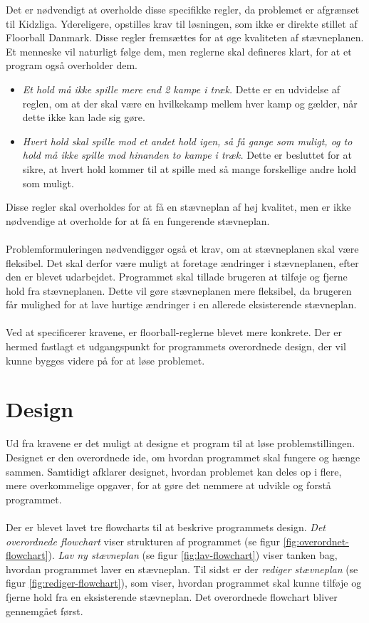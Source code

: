 Det er nødvendigt at overholde disse specifikke regler, da problemet er afgrænset til Kidzliga. Ydereligere, opstilles krav til løsningen, som ikke er direkte stillet af Floorball Danmark. Disse regler fremsættes for at øge kvaliteten af stævneplanen. Et menneske vil naturligt følge dem, men reglerne skal defineres klart, for at et program også overholder dem.
\begin{itemize}
    \item \textit{Et hold må ikke spille mere end 2 kampe i træk.} Dette er en udvidelse af reglen, om at der skal være en hvilkekamp mellem hver kamp og gælder, når dette ikke kan lade sig gøre. 
    \item \textit{Hvert hold skal spille mod et andet hold igen, så få gange som muligt, og to hold må ikke spille mod hinanden to kampe i træk.} Dette er besluttet for at sikre, at hvert hold kommer til at spille med så mange forskellige andre hold som muligt.
\end{itemize}
Disse regler skal overholdes for at få en stævneplan af høj kvalitet, men er ikke nødvendige at overholde for at få en fungerende stævneplan.
\\\\
Problemformuleringen nødvendiggør også et krav, om at stævneplanen skal være fleksibel. Det skal derfor være muligt at foretage ændringer i stævneplanen, efter den er blevet udarbejdet. Programmet skal tillade brugeren at tilføje og fjerne hold fra stævneplanen. Dette vil gøre stævneplanen mere fleksibel, da brugeren får mulighed for at lave hurtige ændringer i en allerede eksisterende stævneplan.
\\\\
Ved at specificerer kravene, er floorball-reglerne blevet mere konkrete. Der er hermed fastlagt et udgangspunkt for programmets overordnede design, der vil kunne bygges videre på for at løse problemet.

\clearpage

\section{Design}\label{afsnit:design}
Ud fra kravene er det muligt at designe et program til at løse problemstillingen. Designet er den overordnede ide, om hvordan programmet skal fungere og hænge sammen. Samtidigt afklarer designet, hvordan problemet kan deles op i flere, mere overkommelige opgaver, for at gøre det nemmere at udvikle og forstå programmet. 
\\\\
Der er blevet lavet tre flowcharts til at beskrive programmets design. \textit{Det overordnede flowchart} viser strukturen af programmet (se figur \ref{fig:overordnet-flowchart}). \textit{Lav ny stævneplan} (se figur \ref{fig:lav-flowchart}) viser tanken bag, hvordan programmet laver en stævneplan. Til sidst er der \textit{rediger stævneplan} (se figur \ref{fig:rediger-flowchart}), som viser, hvordan programmet skal kunne tilføje og fjerne hold fra en eksisterende stævneplan. Det overordnede flowchart bliver gennemgået først.

